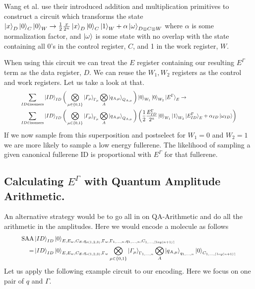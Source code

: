 \documentclass{article}
\begin{document}
\vspace{\baselineskip}
Wang et al. use their introduced addition and multiplication primitives to construct a circuit which transforms the state $\ket{x}_D\ket{0}_C\ket{0}_W \to \frac{1}{2}\frac{x}{2^n}\ket{x}_D\ket{0}_C\ket{1}_W+\alpha\ket{\omega}_{D \otimes C\otimes W}$ where $\alpha$ is some normalization factor, and $\ket{\omega}$ is some state with no overlap with the state containing all 0's in the control register, $C$, and 1 in the work register, $W$.


\vspace{\baselineskip}
When using this circuit we can treat the $E$ register containing our resulting $E^\Gamma$ term as the data register, $D$. We can reuse the $W_1,W_2$ registers as the control and work registers. Let us take a look at that.
\begin{equation}
   \resizebox{.9\hsize}{!}{$\begin{split}
       \sum_{ID\in \text{isomers}}&\ket{ID}_{ID}\bigg(\bigotimes_{\mu\in \{0,1\}}\ket{\varGamma_\mu}_{\Gamma_\mu}\bigotimes_{A}\ket{q_{A,\mu}}_{Q_{A,\mu}}\bigg)\ket{0}_{W_1}\ket{0}_{W_2}\ket{E^\Gamma}_E \to\\ 
       \sum_{ID\in \text{isomers}}&\ket{ID}_{ID}\bigg(\bigotimes_{\mu\in \{0,1\}}\ket{\varGamma_\mu}_{\Gamma_\mu}\bigotimes_{A}\ket{q_{A,\mu}}_{Q_{A,\mu}}\bigg)\left(\frac{1}{2}\frac{E^\Gamma_{ID}}{2^n}\ket{0}_{W_1}\ket{1}_{W_2}\ket{E^\Gamma_{ID}}_E+\alpha_{ID}\ket{\omega_{ID}}\right) \\ 
   \end{split}$}
\end{equation}
If we now sample from this superposition and postselect for $W_1 = 0$ and $W_2 = 1$ we are more likely to sample a low energy fullerene. The likelihood of sampling a given canonical fullerene ID is proportional with $E^\Gamma$ for that fullerene.



\subsection{Calculating $E^\Gamma$ with Quantum Amplitude Arithmetic.}
An alternative strategy would be to go all in on QA-Arithmetic and do all the arithmetic in the amplitudes. 
Here we would encode a molecule as follows
\begin{equation}
   \resizebox{.9\hsize}{!}{$\begin{split}
       \text{SAA}&\ket{ID}_{ID}\ket{0}_{E,E_w,C_E,q_{o(1,2,3)},\Gamma_w,\Gamma_{1,\dots,n},q_{1,\dots,n},C_{1,\dots,\lceil log(n+1) \rceil}}\\
       =&\ket{ID}_{ID}\ket{0}_{E,E_w,C_E,q_{o(1,2,3)},\Gamma_w}\bigotimes_{\mu\in\{0,1\}}\ket{\varGamma_\mu}_{\Gamma_{1,\dots,n}}\bigotimes_{A}\ket{q_{A,\mu}}_{q_{1,\dots,n}}\ket{0}_{C_{1,\dots,\lceil log(n+1) \rceil}}
   \end{split}$}
\end{equation}
Let us apply the following example circuit to our encoding. Here we focus on one pair of $q$ and $\Gamma$. 
\end{document}
